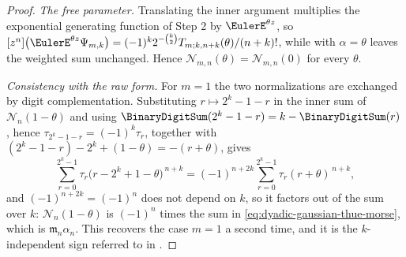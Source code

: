 \documentclass[11pt,a4paper,oneside,openany]{book}
\theoremstyle{definition}
\theoremstyle{remark}
\begin{document}
\begin{proof}
\emph{The free parameter.}  Translating the inner argument multiplies the exponential
generating function of Step 2 by $\EulerE^{\theta z}$, so
$[z^n]\bigl(\EulerE^{\theta z}\Psi_{m,k}\bigr)
 =(-1)^k2^{-\binom k2}T_{m;k,n+k}(\theta)/(n+k)!$, while
 with $\alpha=\theta$ leaves the weighted sum
unchanged.  Hence $\mathcal N_{m,n}(\theta)=\mathcal N_{m,n}(0)$ for every $\theta$.

\emph{Consistency with the raw form.}  For $m=1$ the two normalizations are exchanged
by digit complementation.  Substituting $r\mapsto2^k-1-r$ in the inner sum of
$\mathcal N_n(1-\theta)$ and using $\BinaryDigitSum(2^k-1-r)=k-\BinaryDigitSum(r)$, hence
$\tau_{2^k-1-r}=(-1)^k\tau_r$, together with
$(2^k-1-r)-2^k+(1-\theta)=-(r+\theta)$, gives
\[
 \sum_{r=0}^{2^k-1}\tau_r\bigl(r-2^k+1-\theta\bigr)^{\,n+k}
 =(-1)^{n+2k}\sum_{r=0}^{2^k-1}\tau_r(r+\theta)^{\,n+k},
\]
and $(-1)^{n+2k}=(-1)^n$ does not depend on $k$, so it factors out of the sum over
$k$: $\mathcal N_n(1-\theta)$ is $(-1)^n$ times the sum in
\eqref{eq:dyadic-gaussian-thue-morse}, which is $\mathfrak m_n\alpha_n$.  This
recovers the case $m=1$ a second time, and it is the $k$-independent sign referred to
in .
\end{proof}
\end{document}
